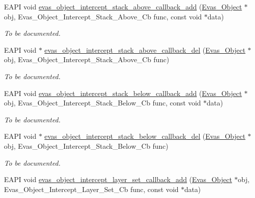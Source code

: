 \begin{DoxyCompactItemize}
EAPI void \hyperlink{group__Evas__Object__Group__Interceptors_ga2312fa84e2a3e406fa3dfcdcad4508e4}{evas\_\-object\_\-intercept\_\-stack\_\-above\_\-callback\_\-add} (\hyperlink{group__Evas__Object__Group_ga9e19e6dd1f517a0ba437c0114d3e7c97}{Evas\_\-Object} $\ast$obj, Evas\_\-Object\_\-Intercept\_\-Stack\_\-Above\_\-Cb func, const void $\ast$data)
\begin{DoxyCompactList}\small\item\em To be documented. \item\end{DoxyCompactList}\item 
EAPI void $\ast$ \hyperlink{group__Evas__Object__Group__Interceptors_gae1bf65a8cd0cdca8de7dc8d2695e793d}{evas\_\-object\_\-intercept\_\-stack\_\-above\_\-callback\_\-del} (\hyperlink{group__Evas__Object__Group_ga9e19e6dd1f517a0ba437c0114d3e7c97}{Evas\_\-Object} $\ast$obj, Evas\_\-Object\_\-Intercept\_\-Stack\_\-Above\_\-Cb func)
\begin{DoxyCompactList}\small\item\em To be documented. \item\end{DoxyCompactList}\item 
EAPI void \hyperlink{group__Evas__Object__Group__Interceptors_ga2ca3156882d8c75ff9f133d919de97a3}{evas\_\-object\_\-intercept\_\-stack\_\-below\_\-callback\_\-add} (\hyperlink{group__Evas__Object__Group_ga9e19e6dd1f517a0ba437c0114d3e7c97}{Evas\_\-Object} $\ast$obj, Evas\_\-Object\_\-Intercept\_\-Stack\_\-Below\_\-Cb func, const void $\ast$data)
\begin{DoxyCompactList}\small\item\em To be documented. \item\end{DoxyCompactList}\item 
EAPI void $\ast$ \hyperlink{group__Evas__Object__Group__Interceptors_ga3ea2c39efe906e667c7ee6ff3e495077}{evas\_\-object\_\-intercept\_\-stack\_\-below\_\-callback\_\-del} (\hyperlink{group__Evas__Object__Group_ga9e19e6dd1f517a0ba437c0114d3e7c97}{Evas\_\-Object} $\ast$obj, Evas\_\-Object\_\-Intercept\_\-Stack\_\-Below\_\-Cb func)
\begin{DoxyCompactList}\small\item\em To be documented. \item\end{DoxyCompactList}\item 
EAPI void \hyperlink{group__Evas__Object__Group__Interceptors_gad09f0dc01feadf931c7e28ec59c5a006}{evas\_\-object\_\-intercept\_\-layer\_\-set\_\-callback\_\-add} (\hyperlink{group__Evas__Object__Group_ga9e19e6dd1f517a0ba437c0114d3e7c97}{Evas\_\-Object} $\ast$obj, Evas\_\-Object\_\-Intercept\_\-Layer\_\-Set\_\-Cb func, const void $\ast$data)

\end{DoxyCompactItemize}
